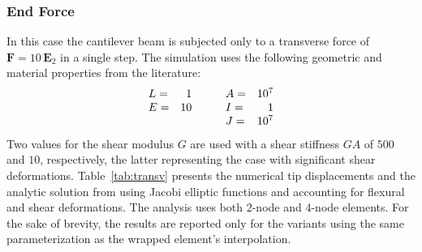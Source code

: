 \subsubsection{End Force}\label{sec:elastica}
In this case the cantilever beam is subjected only to a transverse force of \(\boldsymbol{F} = 10 \, \mathbf{E}_2\) in a single step. 
The simulation uses the following geometric and material properties from the literature:
\[
\begin{array}{lr}
L  =&    1 \\
E  =&   10 \\
\hphantom{.}
\end{array}
\qquad 
\begin{array}{lr}
A  =&   10^7 \\
I  =&    1   \\
J  =&   10^7 \\
\end{array}
\]
Two values for the shear modulus \(G\) are used with a shear stiffness \(GA\) of \(500\) and \(10\), respectively, the latter representing the case with significant shear deformations. 
Table~\ref{tab:transv} presents the numerical tip displacements and the analytic solution from \cite{batista2016closedform} using Jacobi elliptic functions and accounting for flexural and shear deformations.
%
The analysis uses both 2-node and 4-node elements.
For the sake of brevity, the results are reported only for the variants using
the same parameterization as the wrapped element's interpolation.
%
\begin{center}
\begin{table}[H]
\caption{Tip displacements for transversely loaded plane cantilver.}
\label{tab:transv}

\end{table}
\end{center}


